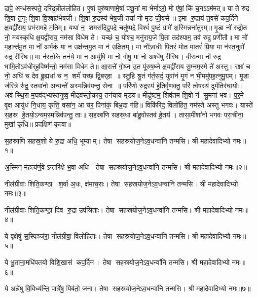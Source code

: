 द्रापे॒ अन्ध॑सस्पते॒ दरि॑द्र॒न्नील॑लोहित। ए॒षां पुरु॑षाणामे॒षां प॑शू॒नां मा भेर्माऽरो॒ मो ए॑षां॒ किं च॒नऽऽम॑मत्॥ या ते॑ रुद्र शि॒वा त॒नूः शि॒वा वि॒श्वाह॑भेषजी। शि॒वा रु॒द्रस्य॑ भेष॒जी तया॑ नो मृड जी॒वसे॥ इ॒मा रु॒द्राय॑ त॒वसे॑ कप॒र्दिने क्ष॒यद्वी॑राय॒ प्रभ॑रामहे म॒तिम्॥ यथा॑ न॒ शमस॑द्द्वि॒पदे॒ चतु॑ष्पदे॒ विश्वं॑ पु॒ष्टं ग्रामे॑ अ॒स्मिन्नना॑तुरम्॥ मृ॒डा नो॑ रुद्रो॒त नो॒ मय॑स्कृधि क्ष॒यद्वी॑राय॒ नम॑सा विधेम ते। यच्छं च॒ योश्च॒ मनु॑राय॒जे पि॒ता तद॑श्याम॒ तव॑ रुद्र॒ प्रणी॑तौ॥ मा नो॑ म॒हान्त॑मु॒त मा नो॑ अर्भ॒कं मा न॒ उक्ष॑न्तमु॒त मा न॑ उक्षि॒तम्। मा नो॑ऽवधीः पि॒तरं॒ मोत मा॒तरं॑ प्रि॒या मा न॑स्त॒नुवो॑ रुद्र रीरिषः॥ मा न॑स्तो॒के तन॑ये॒ मा न॒ आयु॑षि॒ मा नो॒ गोषु॒ मा नो॒ अश्वे॑षु रीरिषः। वी॒रान्मा नो॑ रुद्र भामि॒तोऽव॑धीर्‌ह॒विष्म॑न्तो॒ नम॑सा विधेम ते॥ आ॒रात्ते॑ गो॒घ्न उ॒त पू॑रुष॒घ्ने क्ष॒यद्वी॑राय सु॒म्नम॒स्मे ते॑ अस्तु। रक्षा॑ च नो॒ अधि॑ च देव ब्रू॒ह्यधा॑ च न॒ शर्म॑ यच्छ द्वि॒बर्‌हा॥ स्तु॒हि श्रु॒तं ग॑र्त॒सदं॒ युवा॑नं मृ॒गं न भी॒ममु॑पह॒त्नुमु॒ग्रम्। मृ॒डा ज॑रि॒त्रे रु॑द्र॒ स्तवा॑नो अ॒न्यन्ते॑ अ॒स्मन्निव॑पन्तु॒ सेना॥ परि॑णो रु॒द्रस्य॑ हे॒तिर्वृ॑णक्तु॒ परि॑ त्वे॒षस्य॑ दुर्म॒तिर॑घा॒योः। अव॑ स्थि॒रा म॒घव॑द्भ्यस्तनुष्व॒ मीढ्व॑स्तो॒काय॒ तन॑याय मृडय॥ मीढु॑ष्टम॒ शिव॑तम शि॒वो न॑ सु॒मना॑ भव। प॒र॒मे वृ॒क्ष आयु॑धं नि॒धाय॒ कृत्तिं॒ वसा॑न॒ आ च॑र॒ पिना॑कं॒ बिभ्र॒दा ग॑हि॥ विकि॑रिद॒ विलो॑हित॒ नम॑स्ते अस्तु भगवः। यास्ते॑ स॒हस्र हे॒तयो॒ऽन्यम॒स्मन्निव॑पन्तु॒ ताः॥ स॒हस्रा॑णि सहस्र॒धा बा॑हु॒वोस्तव॑ हे॒तय॑। तासा॒मीशा॑नो भगवः परा॒चीना॒ मुखा॑ कृधि॥
प्रदक्षिणं कृत्वा॥


{\small \closesection}



स॒हस्रा॑णि सहस्र॒शो ये रु॒द्रा अधि॒ भूम्याम्। तेषा सहस्रयोज॒ने\-ऽव॒धन्वा॑नि तन्मसि। श्री महादेवादिभ्यो नमः॥१॥

अ॒स्मिन् म॑ह॒त्य॑र्ण॒वेऽन्तरि॑क्षे भ॒वा अधि॑। तेषा सहस्रयोज॒ने\-ऽव॒धन्वा॑नि तन्मसि। श्री महादेवादिभ्यो नमः॥२॥

नील॑ग्रीवाः शिति॒कण्ठा श॒र्वा अ॒धः, क्ष॑माच॒राः। तेषा सहस्रयोज॒ने\-ऽव॒धन्वा॑नि तन्मसि। श्री महादेवादिभ्यो नमः॥३॥

नील॑ग्रीवाः शिति॒कण्ठा॒ दिव रु॒द्रा उप॑श्रिताः। तेषा सहस्रयोज॒ने\-ऽव॒धन्वा॑नि तन्मसि। श्री महादेवादिभ्यो नमः॥४॥

ये वृ॒क्षेषु॑ स॒स्पिञ्ज॑रा॒ नील॑ग्रीवा॒ विलो॑हिताः। तेषा सहस्रयोज॒ने\-ऽव॒धन्वा॑नि तन्मसि। श्री महादेवादिभ्यो नमः॥५॥

ये भू॒ताना॒मधि॑पतयो विशि॒खास॑ कप॒र्दिन॑। तेषा सहस्रयोज॒ने\-ऽव॒धन्वा॑नि तन्मसि। श्री महादेवादिभ्यो नमः॥६॥

ये अन्ने॑षु वि॒विध्य॑न्ति॒ पात्रे॑षु॒ पिब॑तो॒ जना\sn। तेषा सहस्रयोज॒ने\-ऽव॒धन्वा॑नि तन्मसि। श्री महादेवादिभ्यो नमः॥७॥

